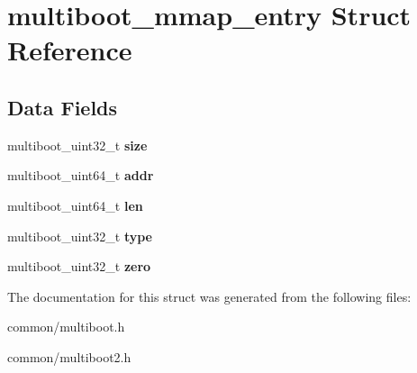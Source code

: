 \hypertarget{structmultiboot__mmap__entry}{}\section{multiboot\+\_\+mmap\+\_\+entry Struct Reference}
\label{structmultiboot__mmap__entry}
\subsection*{Data Fields}
\begin{DoxyCompactItemize}
\item 
multiboot\+\_\+uint32\+\_\+t {\bfseries size}\hypertarget{structmultiboot__mmap__entry_af10c1835051b4b08bdcdb538c1b4101d}{}\label{structmultiboot__mmap__entry_af10c1835051b4b08bdcdb538c1b4101d}

\item 
multiboot\+\_\+uint64\+\_\+t {\bfseries addr}\hypertarget{structmultiboot__mmap__entry_a3f76a637264b83e30967bcd808ff403c}{}\label{structmultiboot__mmap__entry_a3f76a637264b83e30967bcd808ff403c}

\item 
multiboot\+\_\+uint64\+\_\+t {\bfseries len}\hypertarget{structmultiboot__mmap__entry_a6bfa44919a328492fa4e3d6239a23352}{}\label{structmultiboot__mmap__entry_a6bfa44919a328492fa4e3d6239a23352}

\item 
multiboot\+\_\+uint32\+\_\+t {\bfseries type}\hypertarget{structmultiboot__mmap__entry_aa6fc447c57f074d0babfe3bbb7017de9}{}\label{structmultiboot__mmap__entry_aa6fc447c57f074d0babfe3bbb7017de9}

\item 
multiboot\+\_\+uint32\+\_\+t {\bfseries zero}\hypertarget{structmultiboot__mmap__entry_a1e8db52da1ca1c6f5e2e96baec2c9256}{}\label{structmultiboot__mmap__entry_a1e8db52da1ca1c6f5e2e96baec2c9256}

\end{DoxyCompactItemize}


The documentation for this struct was generated from the following files\+:\begin{DoxyCompactItemize}
\item 
common/multiboot.\+h\item 
common/multiboot2.\+h\end{DoxyCompactItemize}
